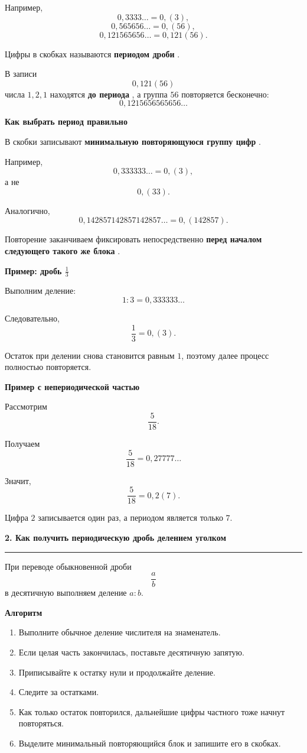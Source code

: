 \documentclass[a4paper,12pt]{article}
\newcommand{\sectiontitle}[1]{%
    \vspace{0.8em}
    {\Large\bfseries\textcolor{darkaccent}{#1}}\par
    \vspace{0.25em}
    \textcolor{accent}{\rule{\linewidth}{0.7pt}}
    \vspace{0.5em}
}
\newcommand{\subsectiontitle}[1]{%
    \vspace{0.6em}
    {\large\bfseries\textcolor{accent}{#1}}\par
    \vspace{0.2em}
}
\newcommand{\important}[1]{%
    \textbf{\textcolor{darkaccent}{#1}}
}
\begin{document}
Например,
\[
0,3333\ldots=0,(3),
\]
\[
0,565656\ldots=0,(56),
\]
\[
0,121565656\ldots=0,121(56).
\]

Цифры в скобках называются \important{периодом дроби}.

В записи
\[
0,121(56)
\]
числа \(1,2,1\) находятся \important{до периода}, а группа \(56\)
повторяется бесконечно:
\[
0,1215656565656\ldots
\]

\subsectiontitle{Как выбрать период правильно}

В скобки записывают \important{минимальную повторяющуюся группу цифр}.

Например,
\[
0,333333\ldots=0,(3),
\]
а не
\[
0,(33).
\]

Аналогично,
\[
0,142857142857142857\ldots=0,(142857).
\]

Повторение заканчиваем фиксировать непосредственно
\important{перед началом следующего такого же блока}.

\subsectiontitle{Пример: дробь \(\frac13\)}

Выполним деление:
\[
1:3=0,333333\ldots
\]

Следовательно,
\[
\boxed{\frac13=0,(3)}.
\]

Остаток при делении снова становится равным \(1\), поэтому далее
процесс полностью повторяется.

\subsectiontitle{Пример с непериодической частью}

Рассмотрим
\[
\frac{5}{18}.
\]

Получаем
\[
\frac{5}{18}=0,27777\ldots
\]

Значит,
\[
\boxed{\frac{5}{18}=0,2(7)}.
\]

Цифра \(2\) записывается один раз, а периодом является только \(7\).

\sectiontitle{2. Как получить периодическую дробь делением уголком}

При переводе обыкновенной дроби
\[
\frac{a}{b}
\]
в десятичную выполняем деление \(a:b\).

\subsectiontitle{Алгоритм}

\begin{enumerate}[leftmargin=2em,itemsep=0.4em]
    \item Выполните обычное деление числителя на знаменатель.
    \item Если целая часть закончилась, поставьте десятичную запятую.
    \item Приписывайте к остатку нули и продолжайте деление.
    \item Следите за остатками.
    \item Как только остаток повторился, дальнейшие цифры частного тоже начнут повторяться.
    \item Выделите минимальный повторяющийся блок и запишите его в скобках.
\end{enumerate}
\end{document}

